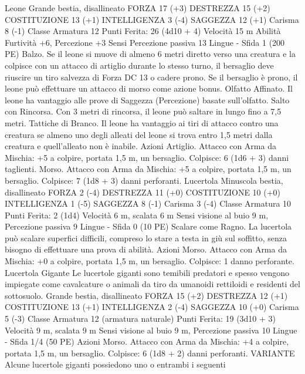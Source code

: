 \begin{multicols}{2}
Leone
Grande bestia, disallineato
FORZA 17 (+3)
DESTREZZA 15 (+2)
COSTITUZIONE 13 (+1)
INTELLIGENZA 3 (-4)
SAGGEZZA 12 (+1)
Carisma 8 (-1)
Classe Armatura 12
\hspace*{0pt}\hfill{Punti Ferita}: 26 (4d10 + 4)
Velocità 15 m
Abilità Furtività +6, Percezione +3
Sensi Percezione passiva 13
Lingue -
Sfida 1 (200 PE)
Balzo. Se il leone si muove di almeno 6 metri diretto verso una
creatura e la colpisce con un attacco di artiglio durante lo stesso
turno, il bersaglio deve riuscire un tiro salvezza di Forza DC 13 o
cadere prono. Se il bersaglio è prono, il leone può effettuare un
attacco di morso come azione bonus.
Olfatto Affinato. Il leone ha vantaggio alle prove di Saggezza
(Percezione) basate sull’olfatto.
Salto con Rincorsa. Con 3 metri di rincorsa, il leone può saltare
in lungo fino a 7,5 metri.
Tattiche di Branco. Il leone ha vantaggio ai tiri di attacco contro
una creatura se almeno uno degli alleati del leone si trova entro
1,5 metri dalla creatura e quell’alleato non è inabile.
Azioni
Artiglio. Attacco con Arma da Mischia: +5 a colpire, portata 1,5
m, un bersaglio.
Colpisce: 6 (1d6 + 3) danni taglienti.
Morso. Attacco con Arma da Mischia: +5 a colpire, portata 1,5
m, un bersaglio.
Colpisce: 7 (1d8 + 3) danni perforanti.
Lucertola
Minuscola bestia, disallineato
FORZA 2 (-4)
DESTREZZA 11 (+0)
COSTITUZIONE 10 (+0)
INTELLIGENZA 1 (-5)
SAGGEZZA 8 (-1)
Carisma 3 (-4)
Classe Armatura 10
\hspace*{0pt}\hfill{Punti Ferita}: 2 (1d4)
Velocità 6 m, scalata 6 m
Sensi visione al buio 9 m, Percezione passiva 9
Lingue -
Sfida 0 (10 PE)
Scalare come Ragno. La lucertola può scalare superfici difficili,
compreso lo stare a testa in giù sul soffitto, senza bisogno di
effettuare una prova di abilità.
Azioni
Morso. Attacco con Arma da Mischia: +0 a colpire, portata 1,5
m, un bersaglio.
Colpisce: 1 danno perforante.
Lucertola Gigante
Le lucertole giganti sono temibili predatori e spesso
vengono impiegate come cavalcature o animali da tiro
da umanoidi rettiloidi e residenti del sottosuolo.
Grande bestia, disallineato
FORZA 15 (+2)
DESTREZZA 12 (+1)
COSTITUZIONE 13 (+1)
INTELLIGENZA 2 (-4)
SAGGEZZA 10 (+0)
Carisma 5 (-3)
Classe Armatura 12 (armatura naturale)
\hspace*{0pt}\hfill{Punti Ferita}: 19 (3d10 + 3)
Velocità 9 m, scalata 9 m
Sensi visione al buio 9 m, Percezione passiva 10
Lingue -
Sfida 1/4 (50 PE)
Azioni
Morso. Attacco con Arma da Mischia: +4 a colpire, portata 1,5
m, un bersaglio.
Colpisce: 6 (1d8 + 2) danni perforanti.
VARIANTE
Alcune lucertole giganti possiedono uno o entrambi i seguenti

\end{multicols}
